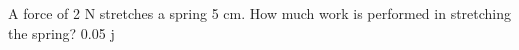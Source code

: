 {A force of 2 N stretches a spring 5 cm. How much work is performed in stretching the spring?}
{0.05 j
}
